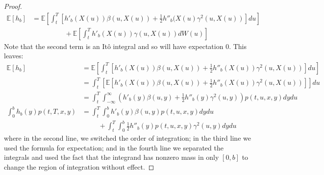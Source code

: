 \documentclass{article}
\newcommand{\E}{\mathbb{E}}
\theoremstyle{definition}
\theoremstyle{definition}
\begin{document}
\begin{enumerate}
\begin{enumerate}[(i)]
    \begin{proof}
    \begin{align*}
        \E[h_b] &= \E\left[ \int_t^T \left[  h'_b(X(u))\beta(u,X(u)) +  \frac{1}{2}h''_b(X(u) \gamma^2(u,X(u)) \right]du\right] \\
        &\hspace{2cm} + \E\left[ \int_t^T h'_b(X(u))\gamma(u,X(u))dW(u) \right]
    \end{align*}
    Note that the second term is an It\^{o} integral and so will have expectation $0$. This leaves:
    \begin{align*}
        \E[h_b] &= \E\left[ \int_t^T \left[  h'_b(X(u))\beta(u,X(u)) +  \frac{1}{2}h''_b(X(u)) \gamma^2(u,X(u)) \right]du\right] \\
        &=  \int_t^T \left[ \E\left[   h'_b(X(u))\beta(u,X(u)) +  \frac{1}{2}h''_b(X(u)) \gamma^2(u,X(u)) \right]\right] du \\
        &= \int_t^T \int_{-\infty}^\infty  \left( h'_b(y)\beta(u,y) +  \frac{1}{2}h''_b(y) \gamma^2(u,y)\right) p(t,u,x,y)   dy du  \\
        \int_0^b h_b(y) p(t,T,x,y) &= \int_t^T\int_0^b  h'_b(y)\beta(u,y)p(t,u,x,y) dy du \\ &\hspace{1cm} + \int_t^T\int_0^b \frac{1}{2}h''_b(y)p(t,u,x,y) \gamma^2(u,y) dy du
    \end{align*}
    where in the second line, we switched the order of integration; in the third line we used the formula for expectation; and in the fourth line we separated the integrals and used the fact that the integrand has nonzero mass in only $[0,b]$ to change the region of integration without effect.
    
    \end{proof}
    

\end{enumerate}
\end{enumerate}
\end{document}
